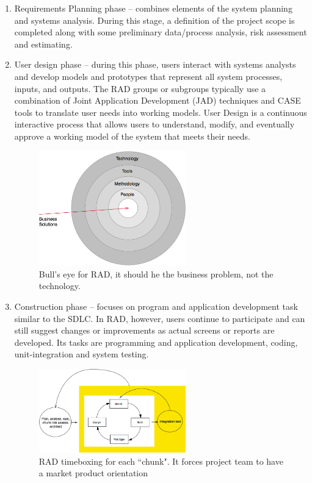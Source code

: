 \begin{enumerate}
\item Requirements Planning phase -- combines elements of the system planning and systems analysis. During this stage, a definition of the project scope is completed along with some preliminary data/process analysis, risk assessment and estimating.

\item User design phase -- during this phase, users interact with systems analysts and develop models and prototypes that represent all system processes, inputs, and outputs. The RAD groups or subgroups typically use a combination of Joint Application Development (JAD) techniques and CASE tools to translate user needs into working models. User Design is a continuous interactive process that allows users to understand, modify, and eventually approve a working model of the system that meets their needs.

\begin{figure}
	\centering
	\includegraphics[width=0.6\textwidth]{resources/Rad-bulls-eye.png}
	\caption[Bull's eye for RAD]{Bull's eye for RAD, it should he the business problem, not the technology.}
\end{figure}

\item Construction phase -- focuses on program and application development task similar to the SDLC. In RAD, however, users continue to participate and can still suggest changes or improvements as actual screens or reports are developed. Its tasks are programming and application development, coding, unit-integration and system testing.

\begin{figure}
	\centering
	\includegraphics[width=0.6\textwidth]{resources/rad-timebox.png}
	\caption[RAD timeboxing]{RAD timeboxing for each ``chunk". It forces project team to have a market product orientation}
\end{figure}



\end{enumerate}
